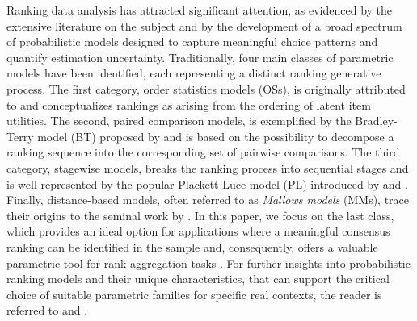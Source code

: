 {
Ranking data analysis has attracted significant attention, as evidenced by the extensive literature on the subject \citep[see][for fundamental reviews]{critchlow91probability, Marden1995} and by the development of a broad spectrum of probabilistic models designed to capture meaningful choice patterns and quantify estimation uncertainty.
Traditionally, four main classes of parametric models have been identified, each representing a distinct ranking generative process. The first category, order statistics models (OSs), is originally attributed to \cite{thurstone27law} and conceptualizes rankings as arising from the ordering of latent item utilities. The second, paired comparison models, is exemplified by the Bradley-Terry model (BT) proposed by \citet{bradley1952rank} and is based on the possibility to decompose a ranking sequence into the corresponding set of pairwise comparisons. The third category, stagewise models, breaks the ranking process into sequential stages and is well represented by the popular Plackett-Luce model (PL) introduced by \cite{Luce1959} and \cite{Plackett1975}. Finally, distance-based models, often referred to as \textit{Mallows models} (MMs), trace their origins to the seminal work by \citet{Mallows1957}.
In this paper, we focus on the last class,
which provides an ideal option for applications where a meaningful consensus ranking can be identified in the sample and, consequently, offers a valuable parametric tool for rank aggregation tasks \citep{Marden1995}. For further insights into probabilistic ranking models and their unique characteristics, that can support the critical choice of suitable parametric families for specific real contexts, the reader is referred to \citet{Liu2019} and \citet{AlvoYu2014}.}

